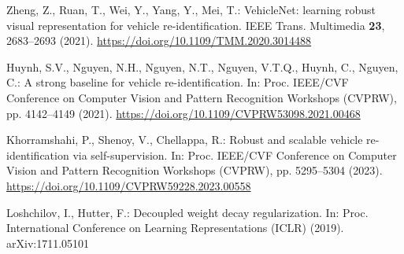 Zheng, Z., Ruan, T., Wei, Y., Yang, Y., Mei, T.: VehicleNet: learning robust
visual representation for vehicle re-identification. IEEE Trans. Multimedia
\textbf{23}, 2683--2693 (2021). \url{https://doi.org/10.1109/TMM.2020.3014488}

Huynh, S.V., Nguyen, N.H., Nguyen, N.T., Nguyen, V.T.Q., Huynh, C., Nguyen, C.:
A strong baseline for vehicle re-identification. In: Proc. IEEE/CVF Conference
on Computer Vision and Pattern Recognition Workshops (CVPRW), pp. 4142--4149
(2021). \url{https://doi.org/10.1109/CVPRW53098.2021.00468}

Khorramshahi, P., Shenoy, V., Chellappa, R.: Robust and scalable vehicle
re-identification via self-supervision. In: Proc. IEEE/CVF Conference on
Computer Vision and Pattern Recognition Workshops (CVPRW), pp. 5295--5304
(2023). \url{https://doi.org/10.1109/CVPRW59228.2023.00558}

Loshchilov, I., Hutter, F.: Decoupled weight decay regularization. In: Proc.
International Conference on Learning Representations (ICLR) (2019).
arXiv:1711.05101
